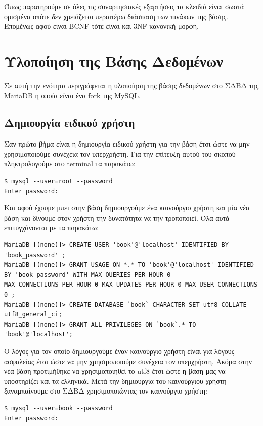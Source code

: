 \documentclass{assignment}
\begin{document}
Όπως παρατηρούμε σε όλες τις συναρτησιακές εξαρτήσεις τα κλειδιά είναι σωστά ορισμένα οπότε δεν χρειάζεται περαιτέρω διάσπαση των πινάκων της βάσης. Επομένως αφού είναι BCNF τότε είναι και 3NF κανονική μορφή.

\section{Υλοποίηση της Βάσης Δεδομένων}

Σε αυτή την ενότητα περιγράφεται η υλοποίηση της βάσης δεδομένων στο ΣΔΒΔ της MariaDB η οποία είναι ένα fork της MySQL.

\subsection{Δημιουργία ειδικού χρήστη}

Σαν πρώτο βήμα είναι η δημιουργία ειδικού χρήστη για την βάση έτσι ώστε να μην χρησιμοποιούμε συνέχεια τον υπερχρήστη. Για την επίτευξη αυτού του σκοπού πληκτρολογούμε στο terminal τα παρακάτω: 

\begin{verbatim}
$ mysql --user=root --password
Enter password: 
\end{verbatim} 

Και αφού έχουμε μπει στην βάση δημιουργούμε ένα καινούργιο χρήστη και μία νέα βάση και δίνουμε στον χρήστη την δυνατότητα να την τροποποιεί. Όλα αυτά επιτυγχάνονται με τα παρακάτω:

\begin{verbatim}
MariaDB [(none)]> CREATE USER 'book'@'localhost' IDENTIFIED BY 'book_password' ;
MariaDB [(none)]> GRANT USAGE ON *.* TO 'book'@'localhost' IDENTIFIED BY 'book_password' WITH MAX_QUERIES_PER_HOUR 0 MAX_CONNECTIONS_PER_HOUR 0 MAX_UPDATES_PER_HOUR 0 MAX_USER_CONNECTIONS 0 ;
MariaDB [(none)]> CREATE DATABASE `book` CHARACTER SET utf8 COLLATE utf8_general_ci;
MariaDB [(none)]> GRANT ALL PRIVILEGES ON `book`.* TO 'book'@'localhost';
\end{verbatim}

Ο λόγος για τον οποίο δημιουργούμε έναν καινούργιο χρήστη είναι για λόγους ασφαλείας έτσι ώστε να μην χρησιμοποιούμε συνέχεια τον υπερχρήστη. Ακόμα στην νέα βάση προτιμήθηκε να χρησιμοποιηθεί το utf8 έτσι ώστε η βάση μας να υποστηρίζει και τα ελληνικά. Μετά την δημιουργία του καινούργιου χρήστη ξαναμπαίνουμε στο ΣΔΒΔ χρησιμοποιώντας τον καινούργιο χρήστη:

\begin{verbatim}
$ mysql --user=book --password
Enter password: 
\end{verbatim} 
\end{document}
